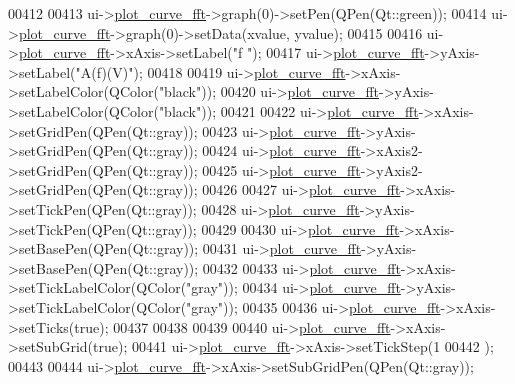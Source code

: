\begin{DoxyCode}
00412 
00413   ui->\hyperlink{a00026_a2bdf46ca3b702151408e6f6bd96b3228}{plot\_curve\_fft}->graph(0)->setPen(QPen(Qt::green));
00414   ui->\hyperlink{a00026_a2bdf46ca3b702151408e6f6bd96b3228}{plot\_curve\_fft}->graph(0)->setData(xvalue, yvalue);
00415 
00416   ui->\hyperlink{a00026_a2bdf46ca3b702151408e6f6bd96b3228}{plot\_curve\_fft}->xAxis->setLabel(\textcolor{stringliteral}{"f "});
00417   ui->\hyperlink{a00026_a2bdf46ca3b702151408e6f6bd96b3228}{plot\_curve\_fft}->yAxis->setLabel(\textcolor{stringliteral}{"A(f)(V)"});
00418 
00419   ui->\hyperlink{a00026_a2bdf46ca3b702151408e6f6bd96b3228}{plot\_curve\_fft}->xAxis->setLabelColor(QColor(\textcolor{stringliteral}{"black"}));
00420   ui->\hyperlink{a00026_a2bdf46ca3b702151408e6f6bd96b3228}{plot\_curve\_fft}->yAxis->setLabelColor(QColor(\textcolor{stringliteral}{"black"}));
00421 
00422   ui->\hyperlink{a00026_a2bdf46ca3b702151408e6f6bd96b3228}{plot\_curve\_fft}->xAxis->setGridPen(QPen(Qt::gray));
00423   ui->\hyperlink{a00026_a2bdf46ca3b702151408e6f6bd96b3228}{plot\_curve\_fft}->yAxis->setGridPen(QPen(Qt::gray));
00424   ui->\hyperlink{a00026_a2bdf46ca3b702151408e6f6bd96b3228}{plot\_curve\_fft}->xAxis2->setGridPen(QPen(Qt::gray));
00425   ui->\hyperlink{a00026_a2bdf46ca3b702151408e6f6bd96b3228}{plot\_curve\_fft}->yAxis2->setGridPen(QPen(Qt::gray));
00426 
00427   ui->\hyperlink{a00026_a2bdf46ca3b702151408e6f6bd96b3228}{plot\_curve\_fft}->xAxis->setTickPen(QPen(Qt::gray));
00428   ui->\hyperlink{a00026_a2bdf46ca3b702151408e6f6bd96b3228}{plot\_curve\_fft}->yAxis->setTickPen(QPen(Qt::gray));
00429 
00430   ui->\hyperlink{a00026_a2bdf46ca3b702151408e6f6bd96b3228}{plot\_curve\_fft}->xAxis->setBasePen(QPen(Qt::gray));
00431   ui->\hyperlink{a00026_a2bdf46ca3b702151408e6f6bd96b3228}{plot\_curve\_fft}->yAxis->setBasePen(QPen(Qt::gray));
00432 
00433   ui->\hyperlink{a00026_a2bdf46ca3b702151408e6f6bd96b3228}{plot\_curve\_fft}->xAxis->setTickLabelColor(QColor(\textcolor{stringliteral}{"gray"}));
00434   ui->\hyperlink{a00026_a2bdf46ca3b702151408e6f6bd96b3228}{plot\_curve\_fft}->yAxis->setTickLabelColor(QColor(\textcolor{stringliteral}{"gray"}));
00435 
00436   ui->\hyperlink{a00026_a2bdf46ca3b702151408e6f6bd96b3228}{plot\_curve\_fft}->xAxis->setTicks(\textcolor{keyword}{true});
00437 
00438 
00439 
00440   ui->\hyperlink{a00026_a2bdf46ca3b702151408e6f6bd96b3228}{plot\_curve\_fft}->xAxis->setSubGrid(\textcolor{keyword}{true});
00441   ui->\hyperlink{a00026_a2bdf46ca3b702151408e6f6bd96b3228}{plot\_curve\_fft}->xAxis->setTickStep(1
00442                                          );
00443 
00444   ui->\hyperlink{a00026_a2bdf46ca3b702151408e6f6bd96b3228}{plot\_curve\_fft}->xAxis->setSubGridPen(QPen(Qt::gray));

\end{DoxyCode}
